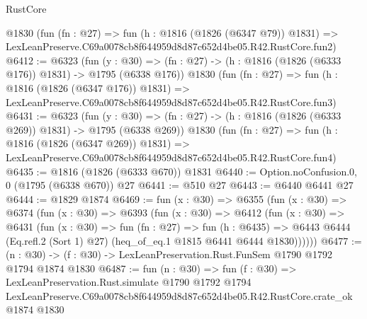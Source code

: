 \begin{lexlean}{RustCore}
\begin{coremodule}
    @1830
    (fun (fn : @27) =>
    fun (h : @1816 (@1826 (@6347 @79)) @1831) =>
    LexLeanPreserve.C69a0078cb8f644959d8d87c652d4be05.R42.RustCore.fun2)
@6412 := @6323
    (fun (y : @30) => (fn : @27) -> (h : @1816 (@1826 (@6333 @176)) @1831) -> @1795 (@6338 @176))
    @1830
    (fun (fn : @27) =>
    fun (h : @1816 (@1826 (@6347 @176)) @1831) =>
    LexLeanPreserve.C69a0078cb8f644959d8d87c652d4be05.R42.RustCore.fun3)
@6431 := @6323
    (fun (y : @30) => (fn : @27) -> (h : @1816 (@1826 (@6333 @269)) @1831) -> @1795 (@6338 @269))
    @1830
    (fun (fn : @27) =>
    fun (h : @1816 (@1826 (@6347 @269)) @1831) =>
    LexLeanPreserve.C69a0078cb8f644959d8d87c652d4be05.R42.RustCore.fun4)
@6435 := @1816 (@1826 (@6333 @670)) @1831
@6440 := Option.noConfusion.{0, 0} (@1795 (@6338 @670)) @27
@6441 := @510 @27
@6443 := @6440 @6441 @27
@6444 := @1829 @1874
@6469 := fun (x : @30) =>
  @6355
    (fun (x : @30) =>
    @6374
      (fun (x : @30) =>
      @6393
        (fun (x : @30) =>
        @6412
          (fun (x : @30) =>
          @6431
            (fun (x : @30) =>
            fun (fn : @27) =>
            fun (h : @6435) =>
            @6443 @6444 (Eq.refl.{2} (Sort 1) @27) (heq_of_eq.{1} @1815 @6441 @6444 @1830))))))
@6477 := (n : @30) -> (f : @30) -> LexLeanPreservation.Rust.FunSem @1790 @1792 @1794 @1874 @1830
@6487 := fun (n : @30) =>
  fun (f : @30) =>
  LexLeanPreservation.Rust.simulate
    @1790
    @1792
    @1794
    LexLeanPreserve.C69a0078cb8f644959d8d87c652d4be05.R42.RustCore.crate_ok
    @1874
    @1830
\end{coremodule}
\end{lexlean}
